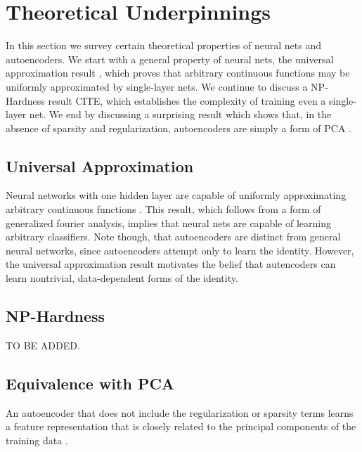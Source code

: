 \documentclass[twocolumn]{article}
\begin{document}


\section{Theoretical Underpinnings}
In this section we survey certain theoretical properties of neural nets and
autoencoders. We start with a general property of neural nets, the universal
approximation result \cite{cybenko1989approximation}, which proves that
arbitrary continuous functions may be uniformly approximated by single-layer
nets. We continue to discuss a NP-Hardness result CITE, which establishes the
complexity of training even a single-layer net. We end by discussing a
surprising result which shows that, in the absence of sparsity and
regularization, autoencoders are simply a form of PCA \cite{bourlard1988auto}.

\subsection{Universal Approximation}
Neural networks with one hidden layer are capable of uniformly approximating
arbitrary continuous functions \cite{cybenko1989approximation}. This result,
which follows from a form of generalized fourier analysis, implies that neural
nets are capable of learning arbitrary classifiers. Note though, that
autoencoders are distinct from general neural networks, since autoencoders
attempt only to learn the identity. However, the universal approximation result
motivates the belief that autencoders can learn nontrivial, data-dependent forms
of the identity.

\subsection{NP-Hardness}
TO BE ADDED.

\subsection{Equivalence with PCA}
An autoencoder that does not include the regularization or sparsity terms learns
a feature representation that is closely related to the principal components of
the training data \cite{bourlard1988auto}. 
\end{document}
